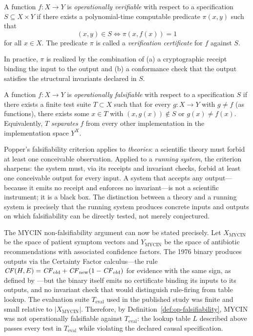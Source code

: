 \begin{definition}
\label{def:op-verifiability}
A function $f : X \to Y$ is \emph{operationally verifiable} with respect to a
specification $S \subseteq X \times Y$ if there exists a polynomial-time computable
predicate $\pi(x, y)$ such that
\[
  (x, y) \in S \iff \pi(x, f(x)) = 1
\]
for all $x \in X$.  The predicate $\pi$ is called a \emph{verification certificate}
for $f$ against $S$.
\end{definition}

In practice, $\pi$ is realized by the combination of (a) a cryptographic receipt
binding the input to the output and (b) a conformance check that the output
satisfies the structural invariants declared in $S$.

\begin{definition}
\label{def:op-falsifiability}
A function $f : X \to Y$ is \emph{operationally falsifiable} with respect to a
specification $S$ if there exists a finite test suite $T \subset X$ such that for
every $g : X \to Y$ with $g \neq f$ (as functions), there exists some $x \in T$
with $(x, g(x)) \notin S$ or $g(x) \neq f(x)$.  Equivalently, $T$
\emph{separates} $f$ from every other implementation in the implementation space
$Y^X$.
\end{definition}

\begin{remark}
Popper's falsifiability criterion \cite{popper1963} applies to \emph{theories}:
a scientific theory must forbid at least one conceivable observation.  Applied to a
\emph{running system}, the criterion sharpens: the system must, via its
receipts and invariant checks, forbid at least one conceivable output for every
input.  A system that accepts any output—because it emits no receipt and enforces
no invariant—is not a scientific instrument; it is a black box.  The distinction
between a theory and a running system is precisely that the running system produces
concrete inputs and outputs on which falsifiability can be directly tested, not
merely conjectured.
\end{remark}

The MYCIN non-falsifiability argument can now be stated precisely.  Let $X_{\text{MYCIN}}$
be the space of patient symptom vectors and $Y_{\text{MYCIN}}$ be the space of
antibiotic recommendations with associated confidence factors.  The 1976 binary
produces outputs via the Certainty Factor calculus---the rule
$\mathit{CF}(H,E) = \mathit{CF}_{\mathrm{old}} + \mathit{CF}_{\mathrm{new}}(1-\mathit{CF}_{\mathrm{old}})$
for evidence with the same sign, as defined by \citet{shortliffe1976}---but the binary itself emits no certificate
binding its inputs to its outputs, and no invariant check that would distinguish
rule-firing from table lookup.  The evaluation suite $T_{\text{eval}}$ used in the
published study was finite and small relative to $\lvert X_{\text{MYCIN}} \rvert$.
Therefore, by Definition~\ref{def:op-falsifiability}, MYCIN was not operationally
falsifiable against $T_{\text{eval}}$: the lookup table $L$ described above passes
every test in $T_{\text{eval}}$ while violating the declared causal specification.

